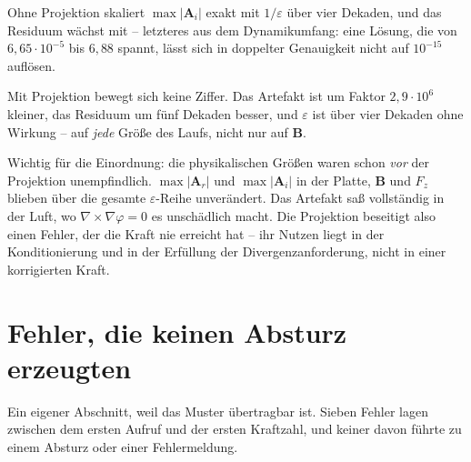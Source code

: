 \documentclass[11pt,a4paper]{article}
\newcommand{\Ar}{\mathbf{A}_r}
\newcommand{\Ai}{\mathbf{A}_i}
\begin{document}
Ohne Projektion skaliert $\max|\Ai|$ exakt mit $1/\varepsilon$ über vier
Dekaden, und das Residuum wächst mit -- letzteres aus dem Dynamikumfang: eine
Lösung, die von $6{,}65\cdot10^{-5}$ bis $6{,}88$ spannt, lässt sich in
doppelter Genauigkeit nicht auf $10^{-15}$ auflösen.

Mit Projektion bewegt sich keine Ziffer. Das Artefakt ist um Faktor
$2{,}9\cdot10^{6}$ kleiner, das Residuum um fünf Dekaden besser, und
$\varepsilon$ ist über vier Dekaden ohne Wirkung -- auf \emph{jede} Größe des
Laufs, nicht nur auf $\mathbf{B}$.

Wichtig für die Einordnung: die physikalischen Größen waren schon \emph{vor}
der Projektion unempfindlich. $\max|\Ar|$ und $\max|\Ai|$ in der Platte,
$\mathbf{B}$ und $F_z$ blieben über die gesamte $\varepsilon$-Reihe
unverändert. Das Artefakt saß vollständig in der Luft, wo
$\nabla\times\nabla\varphi = 0$ es unschädlich macht. Die Projektion beseitigt
also einen Fehler, der die Kraft nie erreicht hat -- ihr Nutzen liegt in der
Konditionierung und in der Erfüllung der Divergenzanforderung, nicht in einer
korrigierten Kraft.

\section{Fehler, die keinen Absturz erzeugten}
\label{sec:fehler}

Ein eigener Abschnitt, weil das Muster übertragbar ist. Sieben Fehler lagen
zwischen dem ersten Aufruf und der ersten Kraftzahl, und keiner davon führte
zu einem Absturz oder einer Fehlermeldung.
\end{document}
